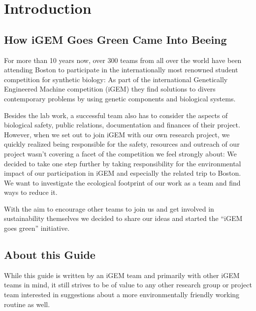 
\chapter*{Introduction}
\section*{How iGEM Goes Green Came Into Beeing}
For more than 10 years now, over 300 teams from all over the world have been attending Boston to participate in the internationally most renowned student competition for synthetic biology: As part of the international Genetically Engineered Machine competition (iGEM) they find solutions to divers contemporary problems by using genetic components and biological systems.

Besides the lab work, a successful team also has to consider the aspects of  biological safety, public relations, documentation and finances of their project. However, when we set out to join iGEM with our own research project, we quickly realized being responsible for the safety, resources and outreach of our project wasn't covering a facet of the competition we feel strongly about: We decided to take one step further by taking responsibility for the environmental impact of our participation in iGEM and especially the related trip to Boston. We want to investigate the ecological footprint of our work as a team and find ways to reduce it. 

With the aim to encourage other teams to join us and get involved in sustainability themselves we decided to share our ideas and started the “iGEM goes green” initiative.

\section*{About this Guide}
While this guide is written by an iGEM team and primarily with other iGEM teams in mind, it still strives to be of value to any other research group or project team interested in suggestions about a more environmentally friendly working routine as well.

